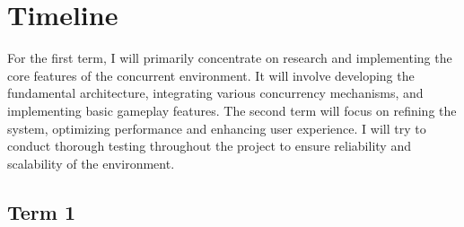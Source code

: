 \documentclass[]{project_plan}
\begin{document}

\chapter{Timeline}

For the first term, I will primarily concentrate on research and implementing the core features of the concurrent
environment. It will involve developing the fundamental architecture, integrating various concurrency mechanisms,
and implementing basic gameplay features. The second term will focus on refining the system,
optimizing performance and enhancing user experience. I will try to conduct thorough testing throughout
the project to ensure reliability and scalability of the environment.

\section{Term 1}
\end{document}
